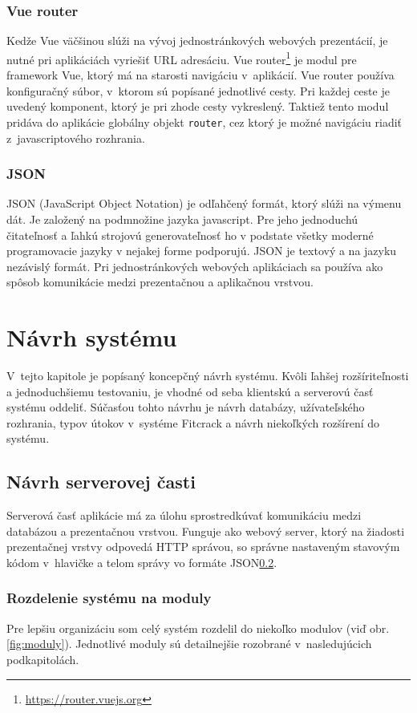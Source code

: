 \documentclass[slovak]{fitthesis}
\begin{document}
\subsection{Vue router}\label{vueRouter}
Kedže Vue väčšinou slúži na vývoj jednostránkových webových prezentácií, je nutné pri aplikáciách vyriešiť URL adresáciu. Vue router\footnote{\url{https://router.vuejs.org}} je modul pre framework Vue, ktorý má na starosti navigáciu v~aplikácií. Vue router používa konfiguračný súbor, v~ktorom sú popísané jednotlivé cesty. Pri každej ceste je uvedený komponent, ktorý je pri zhode cesty vykreslený. Taktiež tento modul pridáva do aplikácie globálny objekt \texttt{router}, cez ktorý je možné navigáciu riadiť z~javascriptového rozhrania.


\subsection{JSON}\label{json}
JSON (JavaScript Object Notation) je odľahčený formát, ktorý slúži na výmenu dát. Je založený na podmnožine jazyka javascript. Pre jeho jednoduchú čitateľnosť a ľahkú strojovú generovateľnosť ho v podstate všetky moderné programovacie jazyky v nejakej forme podporujú. JSON je textový a na jazyku nezávislý formát. Pri jednostránkových webových aplikáciach sa používa ako spôsob komunikácie medzi prezentačnou a aplikačnou vrstvou\cite{JSONrfc}.


\chapter{Návrh systému}\label{navrh}
V~tejto kapitole je popísaný koncepčný návrh systému. Kvôli ľahšej rozšíriteľnosti a jednoduchšiemu testovaniu, je vhodné od seba klientskú a serverovú časť systému oddeliť. Súčasťou tohto návrhu je  návrh databázy, užívateľského rozhrania, typov útokov v~systéme Fitcrack a návrh niekoľkých rozšírení do systému. 

\section{Návrh serverovej časti}\label{navrhServer}
Serverová časť aplikácie má za úlohu sprostredkúvať komunikáciu medzi databázou a prezentačnou vrstvou. Funguje ako webový server, ktorý na žiadosti prezentačnej vrstvy odpovedá HTTP správou, so správne nastaveným stavovým kódom v~hlavičke a telom správy vo formáte JSON\ref{json}.

\subsection{Rozdelenie systému na moduly}
Pre lepšiu organizáciu som celý systém rozdelil do niekoľko modulov (viď obr. \ref{fig:moduly}). Jednotlivé moduly sú detailnejšie rozobrané v~nasledujúcich podkapitolách. 
\end{document}

